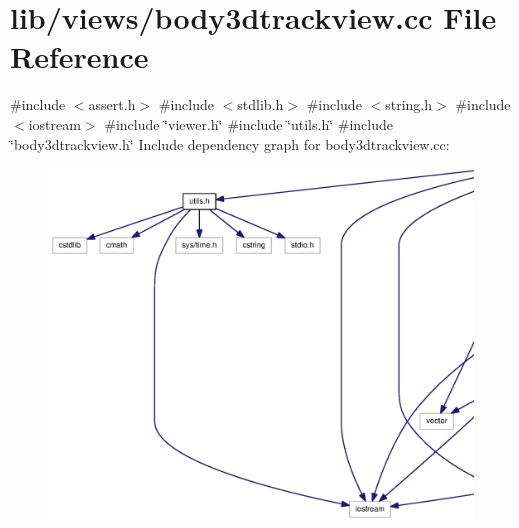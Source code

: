 \section{lib/views/body3dtrackview.cc \-File \-Reference}
\label{body3dtrackview_8cc}
{\ttfamily \#include $<$assert.\-h$>$}\*
{\ttfamily \#include $<$stdlib.\-h$>$}\*
{\ttfamily \#include $<$string.\-h$>$}\*
{\ttfamily \#include $<$iostream$>$}\*
{\ttfamily \#include \char`\"{}viewer.\-h\char`\"{}}\*
{\ttfamily \#include \char`\"{}utils.\-h\char`\"{}}\*
{\ttfamily \#include \char`\"{}body3dtrackview.\-h\char`\"{}}\*
\-Include dependency graph for body3dtrackview.\-cc\-:\nopagebreak
\begin{figure}[H]
\begin{center}
\leavevmode
\includegraphics[width=350pt]{body3dtrackview_8cc__incl}
\end{center}
\end{figure}
